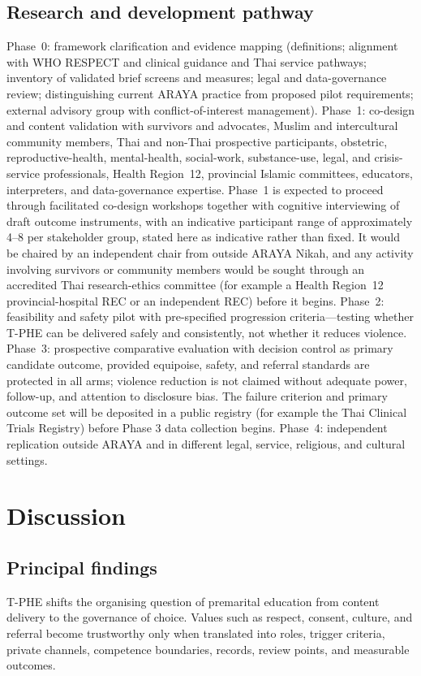 \documentclass[10pt,twocolumn]{article}
\newcommand{\tphe}{T\mbox{-}PHE}
\begin{document}
\subsection{Research and development pathway}
Phase~0: framework clarification and evidence mapping (definitions; alignment with WHO RESPECT and clinical guidance and Thai service pathways; inventory of validated brief screens and measures; legal and data-governance review; distinguishing current ARAYA practice from proposed pilot requirements; external advisory group with conflict-of-interest management). Phase~1: co-design and content validation with survivors and advocates, Muslim and intercultural community members, Thai and non-Thai prospective participants, obstetric, reproductive-health, mental-health, social-work, substance-use, legal, and crisis-service professionals, Health Region~12, provincial Islamic committees, educators, interpreters, and data-governance expertise. Phase~1 is expected to proceed through facilitated co-design workshops together with cognitive interviewing of draft outcome instruments, with an indicative participant range of approximately 4--8 per stakeholder group, stated here as indicative rather than fixed. It would be chaired by an independent chair from outside ARAYA Nikah, and any activity involving survivors or community members would be sought through an accredited Thai research-ethics committee (for example a Health Region~12 provincial-hospital REC or an independent REC) before it begins. Phase~2: feasibility and safety pilot with pre-specified progression criteria---testing whether \tphe{} can be delivered safely and consistently, not whether it reduces violence. Phase~3: prospective comparative evaluation with decision control as primary candidate outcome, provided equipoise, safety, and referral standards are protected in all arms; violence reduction is not claimed without adequate power, follow-up, and attention to disclosure bias. The failure criterion and primary outcome set will be deposited in a public registry (for example the Thai Clinical Trials Registry) before Phase 3 data collection begins. Phase~4: independent replication outside ARAYA and in different legal, service, religious, and cultural settings.

\section{Discussion}

\subsection{Principal findings}
\tphe{} shifts the organising question of premarital education from content delivery to the governance of choice. Values such as respect, consent, culture, and referral become trustworthy only when translated into roles, trigger criteria, private channels, competence boundaries, records, review points, and measurable outcomes.
\end{document}
